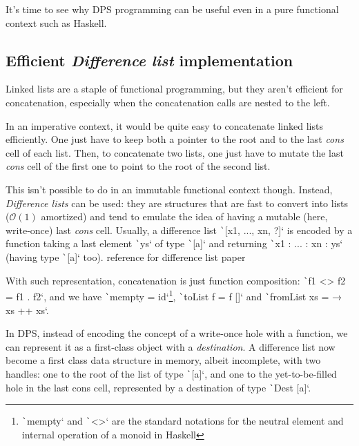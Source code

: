 \documentclass[english]{jflart}
\newcommand{\TODO}[1]{{\color{red}\large #1}}
\begin{document}
It's time to see why DPS programming can be useful even in a pure functional context such as Haskell.

\subsection{Efficient \emph{Difference list} implementation}

Linked lists are a staple of functional programming, but they aren't efficient for concatenation, especially when the concatenation calls are nested to the left.

In an imperative context, it would be quite easy to concatenate linked lists efficiently. One just have to keep both a pointer to the root and to the last \emph{cons} cell of each list. Then, to concatenate two lists, one just have to mutate the last \emph{cons} cell of the first one to point to the root of the second list.

This isn't possible to do in an immutable functional context though. Instead, \emph{Difference lists} can be used: they are structures that are fast to convert into lists ($\mathcal{O}(1)$ amortized) and tend to emulate the idea of having a mutable (here, write-once) last \emph{cons} cell. Usually, a difference list \texttt`[x1, ..., xn, ?]` is encoded by a function taking a last element \texttt`ys` of type \texttt`[a]` and returning \texttt`x1 : ... : xn : ys` (having type \texttt`[a]` too). \TODO{reference for difference list paper}

With such representation, concatenation is just function composition: \texttt`f1 <> f2 = f1 . f2`, and we have \texttt`mempty = id`\footnote{\texttt`mempty` and \texttt`<>` are the standard notations for the neutral element and internal operation of a monoid in Haskell}, \texttt`toList f = f []` and \texttt`fromList xs = \ys → xs ++ xs`.

In DPS, instead of encoding the concept of a write-once hole with a function, we can represent it as a first-class object with a \emph{destination}. A difference list now become a first class data structure in memory, albeit incomplete, with two handles: one to the root of the list of type \texttt`[a]`, and one to the yet-to-be-filled hole in the last cons cell, represented by a destination of type \texttt`Dest [a]`.
\end{document}
